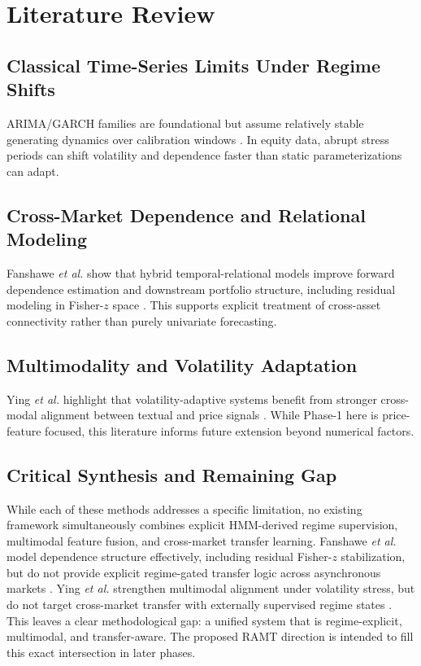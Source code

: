 \documentclass[conference]{IEEEtran}
\begin{document}
\section{Literature Review}
\subsection{Classical Time-Series Limits Under Regime Shifts}
ARIMA/GARCH families are foundational but assume relatively stable generating dynamics over calibration windows \cite{boxjenkins,engle1982,bollerslev1986}. In equity data, abrupt stress periods can shift volatility and dependence faster than static parameterizations can adapt.

\subsection{Cross-Market Dependence and Relational Modeling}
Fanshawe \emph{et al.} show that hybrid temporal-relational models improve forward dependence estimation and downstream portfolio structure, including residual modeling in Fisher-\(z\) space \cite{fanshawe2025}. This supports explicit treatment of cross-asset connectivity rather than purely univariate forecasting.

\subsection{Multimodality and Volatility Adaptation}
Ying \emph{et al.} highlight that volatility-adaptive systems benefit from stronger cross-modal alignment between textual and price signals \cite{ying2026}. While Phase-1 here is price-feature focused, this literature informs future extension beyond numerical factors.

\subsection{Critical Synthesis and Remaining Gap}
While each of these methods addresses a specific limitation, no existing framework simultaneously combines explicit HMM-derived regime supervision, multimodal feature fusion, and cross-market transfer learning. Fanshawe \emph{et al.} model dependence structure effectively, including residual Fisher-\(z\) stabilization, but do not provide explicit regime-gated transfer logic across asynchronous markets \cite{fanshawe2025}. Ying \emph{et al.} strengthen multimodal alignment under volatility stress, but do not target cross-market transfer with externally supervised regime states \cite{ying2026}. This leaves a clear methodological gap: a unified system that is regime-explicit, multimodal, and transfer-aware. The proposed RAMT direction is intended to fill this exact intersection in later phases.
\end{document}
